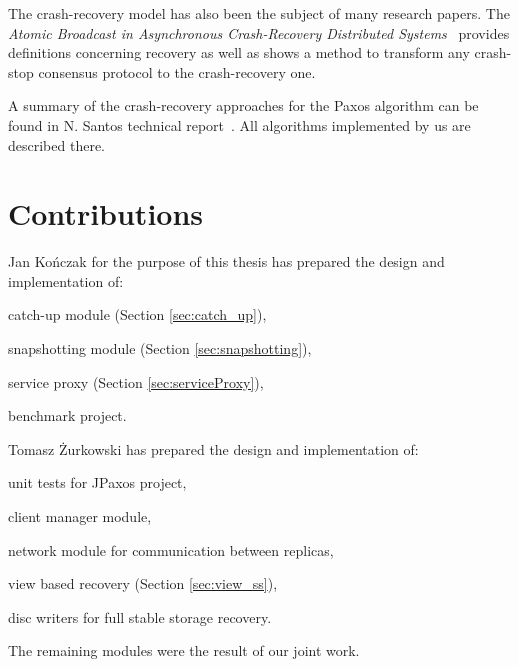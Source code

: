 The crash-recovery model has also been the subject of many research papers. The \textit{Atomic Broadcast in Asynchronous Crash-Recovery Distributed Systems}~\cite{rodriguez2000atomic} provides definitions concerning recovery as well as shows a method to transform any crash-stop consensus protocol to the crash-recovery one.

A summary of the crash-recovery approaches for the Paxos algorithm can be found in N. Santos technical report~\cite{Nun10}. All algorithms implemented by us are described there.

\section{Contributions}

Jan Kończak for the purpose of this thesis has prepared the design and implementation of:
\begin{tightList}
  \item[\textbullet] catch-up module (Section \ref{sec:catch_up}),
  \item[\textbullet] snapshotting module (Section \ref{sec:snapshotting}),
  \item[\textbullet] service proxy  (Section \ref{sec:serviceProxy}),
  \item[\textbullet] benchmark project.
\end{tightList}

\noindent Tomasz Żurkowski has prepared the design and implementation of:
\begin{tightList}
  \item[\textbullet] unit tests for JPaxos project,
  \item[\textbullet] client manager module, 
  \item[\textbullet] network module for communication between replicas,
  \item[\textbullet] view based recovery (Section \ref{sec:view_ss}),
  \item[\textbullet] disc writers for full stable storage recovery.
\end{tightList}

\noindent The remaining modules were the result of our joint work.

